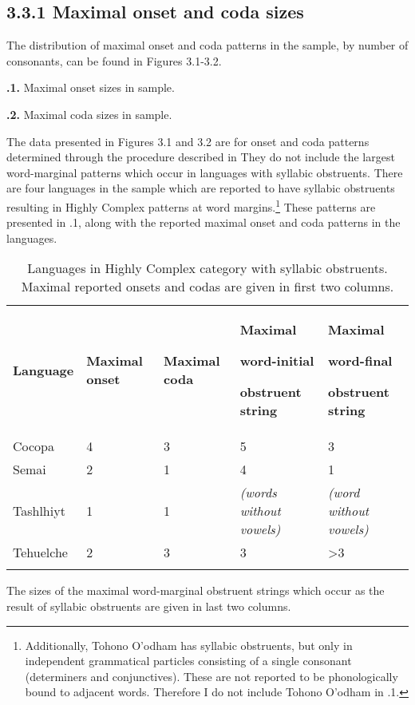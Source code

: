\subsection{3.3.1 Maximal onset and coda sizes}

  The distribution of maximal onset and coda patterns in the sample, by number of consonants, can be found in Figures 3.1-3.2.





\textbf{.1.} Maximal onset sizes in sample.





\textbf{.2.} Maximal coda sizes in sample.



  The data presented in Figures 3.1 and 3.2 are for onset and coda patterns determined through the procedure described in  They do not include the largest word-marginal patterns which occur in languages with syllabic obstruents. There are four languages in the sample which are reported to have syllabic obstruents resulting in Highly Complex patterns at word margins.\footnote{ \textrm{Additionally, Tohono O’odham has syllabic obstruents, but only in independent grammatical particles consisting of a single consonant (determiners and conjunctives). These are not reported to be phonologically bound to adjacent words. Therefore I do not include Tohono O’odham in .1.}} These patterns are presented in .1, along with the reported maximal onset and coda patterns in the languages.






\begin{table}
\begin{tabularx}{\textwidth}{XXXXX}
\lsptoprule

\textbf{Language} & \textbf{Maximal} \textbf{onset} & \textbf{Maximal} \textbf{coda} & { \textbf{Maximal} }

{ \textbf{word-initial} }

 \textbf{obstruent} \textbf{string} & { \textbf{Maximal} }

{ \textbf{word-final} }

 \textbf{obstruent} \textbf{string}\\
Cocopa & 4 & 3 & 5 & 3\\
Semai & 2 & 1 & 4 & 1\\
Tashlhiyt & 1 & 1 & \textit{(words} \textit{without} \textit{vowels)} & \textit{(word} \textit{without} \textit{vowels)}\\
Tehuelche & 2 & 3 & 3 & >3\\
\lspbottomrule
\end{tabularx}
\caption{\label{3.1}Languages in Highly Complex category with syllabic obstruents. Maximal reported onsets and codas are given in first two columns.}The sizes of the maximal word-marginal obstruent strings which occur as the result of syllabic obstruents are given in last two columns.
\end{table}




